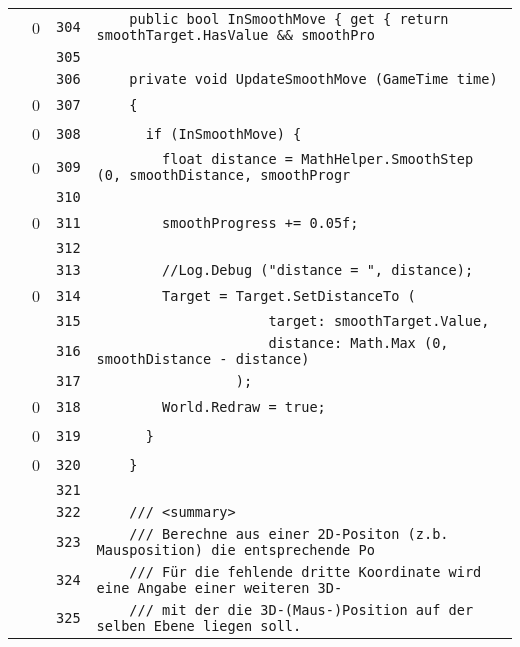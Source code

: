\documentclass[a4paper,10pt]{article}
\begin{document}
\begin{longtable}[l]{lrrl}
\cellcolor{red} & 0 & \verb~304~ & \verb~    public bool InSmoothMove { get { return smoothTarget.HasValue && smoothPro~\\
\cellcolor{gray} &  & \verb~305~ & \verb~~\\
\cellcolor{gray} &  & \verb~306~ & \verb~    private void UpdateSmoothMove (GameTime time)~\\
\cellcolor{red} & 0 & \verb~307~ & \verb~    {~\\
\cellcolor{red} & 0 & \verb~308~ & \verb~      if (InSmoothMove) {~\\
\cellcolor{red} & 0 & \verb~309~ & \verb~        float distance = MathHelper.SmoothStep (0, smoothDistance, smoothProgr~\\
\cellcolor{gray} &  & \verb~310~ & \verb~~\\
\cellcolor{red} & 0 & \verb~311~ & \verb~        smoothProgress += 0.05f;~\\
\cellcolor{gray} &  & \verb~312~ & \verb~~\\
\cellcolor{gray} &  & \verb~313~ & \verb~        //Log.Debug ("distance = ", distance);~\\
\cellcolor{red} & 0 & \verb~314~ & \verb~        Target = Target.SetDistanceTo (~\\
\cellcolor{gray} &  & \verb~315~ & \verb~                     target: smoothTarget.Value,~\\
\cellcolor{gray} &  & \verb~316~ & \verb~                     distance: Math.Max (0, smoothDistance - distance)~\\
\cellcolor{gray} &  & \verb~317~ & \verb~                 );~\\
\cellcolor{red} & 0 & \verb~318~ & \verb~        World.Redraw = true;~\\
\cellcolor{red} & 0 & \verb~319~ & \verb~      }~\\
\cellcolor{red} & 0 & \verb~320~ & \verb~    }~\\
\cellcolor{gray} &  & \verb~321~ & \verb~~\\
\cellcolor{gray} &  & \verb~322~ & \verb~    /// <summary>~\\
\cellcolor{gray} &  & \verb~323~ & \verb~    /// Berechne aus einer 2D-Positon (z.b. Mausposition) die entsprechende Po~\\
\cellcolor{gray} &  & \verb~324~ & \verb~    /// Für die fehlende dritte Koordinate wird eine Angabe einer weiteren 3D-~\\
\cellcolor{gray} &  & \verb~325~ & \verb~    /// mit der die 3D-(Maus-)Position auf der selben Ebene liegen soll.~\\

\end{longtable}
\end{document}
